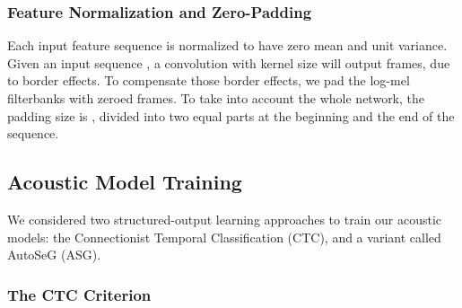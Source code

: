\documentclass{article}
\begin{document}
\subsubsection{Feature Normalization and Zero-Padding}

Each input feature sequence is normalized to have zero mean and unit variance.
Given an input sequence , a convolution
with kernel size  will output  frames, due to border effects. To
compensate those border effects, we pad the log-mel filterbanks 
with zeroed frames. To take into account the whole network, the padding size
is , divided into two equal parts at the beginning and the
end of the sequence.


\subsection{Acoustic Model Training}

\begin{figure*}[h]
  \centering
{}
  \hspace*{0.1cm}
  \hspace*{0.1cm}
  \caption{
    \label{fig-asg}
    (a) The CTC graph which represents all the acceptable sequences of
    letters for the transcription ``cat'' over 6 frames. (b) The same graph
    used by ASG, where blank labels have been discarded. (c) The fully
    connected graph describing all possible sequences of letter; this graph
    is used for normalization purposes in ASG. Un-normalized transitions
    scores are possible on edges of these graphs. At each time step, nodes
    are assigned a conditional un-normalized score, output by the Gated
    ConvNet acoustic model.}
\end{figure*}
We considered two structured-output learning approaches to train our
acoustic models: the Connectionist Temporal Classification (CTC), and a variant
called AutoSeG (ASG).

\subsubsection{The CTC Criterion}
\label{sec-ctccriterion}
\end{document}
